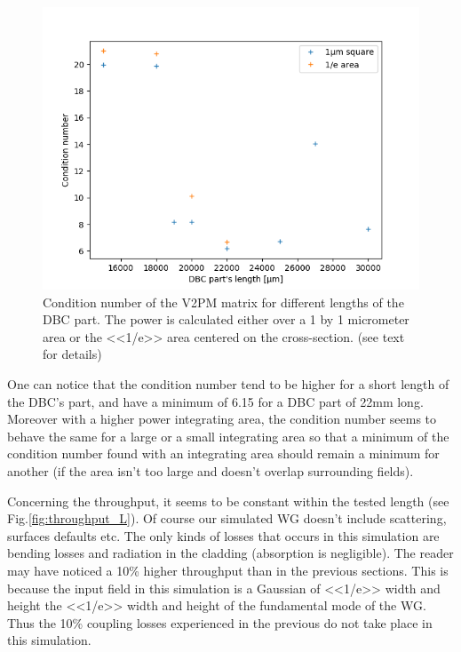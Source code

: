 \begin{figure}[htbp]
  \centering
  \includegraphics[scale=.5]{picture/geometry/CondNvsL.png}
  \caption{Condition number of the V2PM matrix for different lengths
    of the DBC part. The power is calculated either over a 1 by 1
    micrometer area or the <<1/e>> area centered on the
    cross-section. (see text for details)}
  \label{fig:length}
\end{figure}
One can notice that the condition number tend to be higher
for a short length of the DBC's part, and have a minimum of 6.15 for a
DBC part of 22mm
long. Moreover with a higher power integrating area, the condition number
seems to behave the same for a large or a small integrating area so
that a minimum of the condition number found with an integrating area
should remain a minimum for another (if the area isn't too large and
doesn't overlap surrounding fields).

Concerning the throughput, it seems to be constant within the tested
length (see Fig.\ref{fig:throughput_L}). Of course our simulated WG doesn't include scattering, surfaces defaults etc. The only kinds of losses that occurs
in this simulation are bending losses and
radiation in the cladding (absorption is negligible). The reader may have noticed a 10\% higher
throughput than in the previous sections. This is because the input
field in this simulation is a Gaussian of <<1/e>> width and height the
<<1/e>> width and height of the fundamental mode of the WG. Thus the
10\% coupling losses experienced in the previous do not take place in
this simulation.


